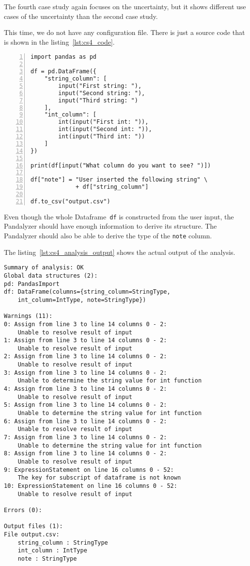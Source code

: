 The fourth case study again focuses on the uncertainty, but it shows different use cases of the uncertainty than the
second case study.

This time, we do not have any configuration file.
There is just a source code that is shown in the listing~\ref{lst:cs4_code}.

\begin{lstlisting}[caption=Code for the fourth case study in Pandas, label={lst:cs4_code}, captionpos=b, numbers=left]
import pandas as pd

df = pd.DataFrame({
    "string_column": [
        input("First string: "),
        input("Second string: "),
        input("Third string: ")
    ],
    "int_column": [
        int(input("First int: ")),
        int(input("Second int: ")),
        int(input("Third int: "))
    ]
})

print(df[input("What column do you want to see? ")])

df["note"] = "User inserted the following string" \
             + df["string_column"]

df.to_csv("output.csv")
\end{lstlisting}

Even though the whole Dataframe~\verb|df| is constructed from the user input, the Pandalyzer should have enough
information to derive its structure.
The Pandalyzer should also be able to derive the type of the \verb|note| column.

The listing~\ref{lst:cs4_analysis_output} shows the actual output of the analysis.

\begin{lstlisting}[caption=Analysis output of the fourth case study, label={lst:cs4_analysis_output}, captionpos=b]
Summary of analysis: OK
Global data structures (2):
pd: PandasImport
df: DataFrame(columns={string_column=StringType,
    int_column=IntType, note=StringType})

Warnings (11):
0: Assign from line 3 to line 14 columns 0 - 2:
    Unable to resolve result of input
1: Assign from line 3 to line 14 columns 0 - 2:
    Unable to resolve result of input
2: Assign from line 3 to line 14 columns 0 - 2:
    Unable to resolve result of input
3: Assign from line 3 to line 14 columns 0 - 2:
    Unable to determine the string value for int function
4: Assign from line 3 to line 14 columns 0 - 2:
    Unable to resolve result of input
5: Assign from line 3 to line 14 columns 0 - 2:
    Unable to determine the string value for int function
6: Assign from line 3 to line 14 columns 0 - 2:
    Unable to resolve result of input
7: Assign from line 3 to line 14 columns 0 - 2:
    Unable to determine the string value for int function
8: Assign from line 3 to line 14 columns 0 - 2:
    Unable to resolve result of input
9: ExpressionStatement on line 16 columns 0 - 52:
    The key for subscript of dataframe is not known
10: ExpressionStatement on line 16 columns 0 - 52:
    Unable to resolve result of input

Errors (0):

Output files (1):
File output.csv:
    string_column : StringType
    int_column : IntType
    note : StringType
\end{lstlisting}

